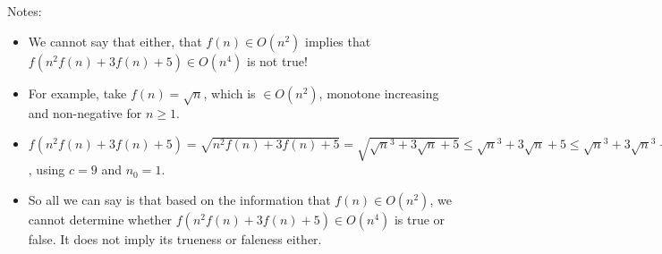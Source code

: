Notes:
\begin{itemize}
\item We cannot say that either, that $f(n)\in{}O(n^2)$ implies that $f(n^2f(n)+3f(n)+5) \in{} O(n^4)$ is not true!
\item For example, take $f(n)=\sqrt{n}$, which is $\in{}O(n^2)$, monotone increasing and non-negative for $n\geq{}1$.
\item $f(n^2f(n)+3f(n)+5) = \sqrt{n^2f(n)+3f(n)+5} = \sqrt{\sqrt{n}^3+3\sqrt{n}+5} \leq{} \sqrt{n}^3 + 3\sqrt{n} + 5 \leq{}  \sqrt{n}^3 + 3\sqrt{n}^3 + 5\sqrt{n}^3 = 9\sqrt{n}^3 = 9n^{1.5} \in{} O(n^2)$, using $c=9$ and $n_0=1$.
\item So all we can say is that based on the information that $f(n)\in{}O(n^2)$, we cannot determine whether $f(n^2f(n)+3f(n)+5) \in{} O(n^4)$ is true or false. It does not imply its trueness or faleness either.
\end{itemize}

